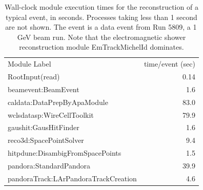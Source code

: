 \documentclass[../main-v1.tex]{subfiles}
\begin{document}
\begin{longtable}
{l r}
\caption[Processing time for reconstruction modules for a  event]{Wall-clock module execution times for the reconstruction of a typical  event, in seconds.  Processes taking less than 1 second are not shown. The event is a data event from Run 5809, a 1\,GeV beam run.
Note that the electromagnetic shower reconstruction module EmTrackMichelId  dominates. } \\ \toprowrule
  \rowcolor{dunesky}
Module Label & time/event (sec)\\ \toprowrule
RootInput(read)                          &     0.14\\%
beamevent:BeamEvent                      &      1.6\\%
caldata:DataPrepByApaModule              &      83.0\\%
wclsdatasp:WireCellToolkit               &      79.9\\%
gaushit:GausHitFinder                    &      1.6\\%
reco3d:SpacePointSolver                  &      9.4\\%
hitpdune:DisambigFromSpacePoints         &      1.5\\%
pandora:StandardPandora                  &      39.9\\%
pandoraTrack:LArPandoraTrackCreation     &      4.6\\%

\end{longtable}
\end{document}
